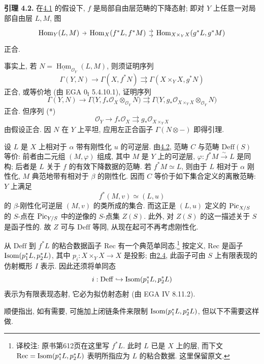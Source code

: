\textbf{引理 4.2.} 在\hyperlink{sga6.e12.prop.4-1}{4.1} 的假设下, $f$ 是局部自由层范畴的下降态射; 即对 $Y$ 上任意一对局部自由层 $L,M$, 图
\[
\begin{tikzcd}[column sep=tiny]
\operatorname{Hom}_Y(L,M) \arrow[r] &
  \operatorname{Hom}_X(f^*L,f^*M)
    \arrow[r,shift left=.7ex] \arrow[r,shift right=.7ex] &
  \operatorname{Hom}_{X\times_YX}(g^*L,g^*M)
\end{tikzcd}
\]
正合.

事实上, 若 $N=\underline{\operatorname{Hom}}_{\mathcal O_Y}(L,M)$, 则须证明序列
\[
  \Gamma(Y,N)\longrightarrow\Gamma(X,f^*N)
  \rightrightarrows\Gamma(X\times_YX,g^*N)
\]
正合, 或等价地 (由 EGA $0_{\mathrm I}$ 5.4.10.1), 证明序列
\[
  \Gamma(Y,N)
  \longrightarrow
  \Gamma\bigl(Y,f_*\mathcal O_X\otimes_{\mathcal O_Y}N\bigr)
  \rightrightarrows
  \Gamma\bigl(Y,g_*\mathcal O_{X\times_YX}
    \otimes_{\mathcal O_Y}N\bigr)
\]
正合. 但序列 (*)
\[
  \mathcal O_Y\longrightarrow f_*\mathcal O_X
  \rightrightarrows g_*\mathcal O_{X\times_YX}
\]
由假设正合. 因 $N$ 在 $Y$ 上平坦, 应用左正合函子 $\Gamma(N\otimes -)$ 即得引理.

设 $L$ 是 $X$ 上相对于 $\alpha$ 带有刚性化 $u$ 的可逆层. 由\hyperlink{sga6.e12.lem.4-2}{4.2}, 范畴 $C$ 与范畴 $\mathrm{Deff}(S)$ 等价: 前者由二元组 $(M,\varphi)$ 组成, 其中 $M$ 是 $Y$ 上的可逆层, $\varphi:f^*M\xrightarrow{\sim}L$ 是同构; 后者是 $L$ 关于 $f$ 的有效下降数据的范畴. 若 $f^*M\simeq L$, 则由于 $L$ 相对于 $\alpha$ 刚性化, $M$ 典范地带有相对于 $\beta$ 的刚性化. 因而 $C$ 等价于如下集合定义的离散范畴: $Y$ 上满足
\[
  f^*(M,v)\simeq(L,u)
\]
的 $\beta$-刚性化可逆层 $(M,v)$ 的类所成的集合. 而这正是 $(L,u)$ 定义的 $\operatorname{Pic}_{X/S}$ 的 $S$-点在 $\operatorname{Pic}_{Y/S}$ 中的逆像的 $S$-点集 $Z(S)$. 此外, 对 $Z(S)$ 的这一描述关于 $S$ 是函子性的. 故 $Z$ 可与 $\mathrm{Deff}$ 等同, 从现在起可不再考虑刚性化.

从 \(\mathrm{Deff}\) 到 \(f^*L\) 的粘合数据函子 \(\mathrm{Rec}\) 有一个典范单同态.\footnote{译校注: 原书第612页在这里写 $f^*L$. 此时 $L$ 已是 $X$ 上的层, 而下文 $\mathrm{Rec}=\operatorname{Isom}(p_1^*L,p_2^*L)$ 表明所指应为 $L$ 的粘合数据. 这里保留原文.} 按定义, \(\mathrm{Rec}\) 是函子 \(\operatorname{Isom}(p_1^*L,p_2^*L)\), 其中 \(p_i:X\times_YX\to X\) 是投影; 由\hyperlink{sga6.e12.lem.2-4}{2.4}, 此函子可由 \(S\) 上有限表现的仿射概形 \(I\) 表示. 因此还须将单同态
\[
  i:\mathrm{Deff}\hookrightarrow \operatorname{Isom}(p_1^*L,p_2^*L)
\]
表示为有限表现态射, 它必为拟仿射态射 (由 EGA IV 8.11.2).

顺便指出, 如有需要, 可施加上闭链条件来限制 \(\operatorname{Isom}(p_1^*L,p_2^*L)\), 但以下不需要这样做.


